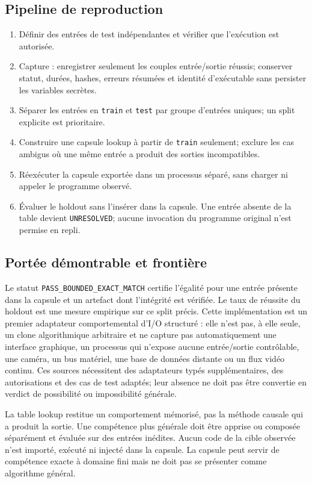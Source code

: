 \documentclass[11pt,a4paper]{article}
\begin{document}
\subsection{Pipeline de reproduction}
\begin{enumerate}[nosep]
\item Définir des entrées de test indépendantes et vérifier que l'exécution est autorisée.
\item Capture : enregistrer seulement les couples entrée/sortie réussis; conserver statut, durées, hashes, erreurs résumées et identité d'exécutable sans persister les variables secrètes.
\item Séparer les entrées en \texttt{train} et \texttt{test} par groupe d'entrées uniques; un split explicite est prioritaire.
\item Construire une capsule lookup à partir de \texttt{train} seulement; exclure les cas ambigus où une même entrée a produit des sorties incompatibles.
\item Réexécuter la capsule exportée dans un processus séparé, sans charger ni appeler le programme observé.
\item Évaluer le holdout sans l'insérer dans la capsule. Une entrée absente de la table devient \texttt{UNRESOLVED}; aucune invocation du programme original n'est permise en repli.
\end{enumerate}

\subsection{Portée démontrable et frontière}
Le statut \texttt{PASS\_BOUNDED\_EXACT\_MATCH} certifie l'égalité pour une entrée présente dans la capsule et un artefact dont l'intégrité est vérifiée. Le taux de réussite du holdout est une mesure empirique sur ce split précis. Cette implémentation est un premier adaptateur comportemental d'I/O structuré : elle n'est pas, à elle seule, un clone algorithmique arbitraire et ne capture pas automatiquement une interface graphique, un processus qui n'expose aucune entrée/sortie contrôlable, une caméra, un bus matériel, une base de données distante ou un flux vidéo continu. Ces sources nécessitent des adaptateurs typés supplémentaires, des autorisations et des cas de test adaptés; leur absence ne doit pas être convertie en verdict de possibilité ou impossibilité générale.

La table lookup restitue un comportement mémorisé, pas la méthode causale qui a produit la sortie. Une compétence plus générale doit être apprise ou composée séparément et évaluée sur des entrées inédites. Aucun code de la cible observée n'est importé, exécuté ni injecté dans la capsule. La capsule peut servir de compétence exacte à domaine fini mais ne doit pas se présenter comme algorithme général.
\end{document}
